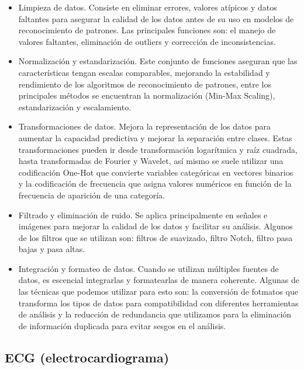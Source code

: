 \begin{itemize}
    \item Limpieza de datos. Consiste en eliminar errores, valores atípicos y datos 
    faltantes para asegurar la calidad de los datos antes de su uso en modelos de 
    reconocimiento de patrones. Las principales funciones son: el manejo de valores 
    faltantes, eliminación de outliers y corrección de inconsistencias.
    
    \item Normalización y estandarización. Este conjunto de funciones aseguran 
    que las características tengan escalas comparables, mejorando la estabilidad y 
    rendimiento de los algoritmos de reconocimiento de patrones, entre los principales 
    métodos se encuentran la normalización (Min-Max Scaling), estandarización y escalamiento.
    
    \item Transformaciones de datos. Mejora la representación de los datos para aumentar 
    la capacidad predictiva y mejorar la separación entre clases. Estas transformaciones 
    pueden ir desde transformación logarítmica y raíz cuadrada, hasta transformadas de 
    Fourier y Wavelet, así mismo se suele utilizar una codificación 
    One-Hot que convierte variables categóricas en vectores binarios y la codificación de 
    frecuencia que asigna valores numéricos en función de la frecuencia de aparición de una 
    categoría.
    
    \item Filtrado y eliminación de ruido. Se aplica principalmente en señales e imágenes 
    para mejorar la calidad de los datos y facilitar su análisis. Algunos de los filtros 
    que se utilizan son: filtros de suavizado, filtro Notch, filtro pasa bajas y pasa altas. 
    
    \item Integración y formateo de datos. Cuando se utilizan múltiples fuentes de datos, 
    es escencial integrarlas y formatearlas de manera coherente. Algunas de las técnicas 
    que podemos utilizar  para esto son: la conversión de fotmatos que transforma los tipos 
    de datos para compatibilidad con diferentes herramientas de análisis y la reducción de 
    redundancia que utilizamos para la eliminación de información duplicada para evitar 
    sesgos en el análisis. 

\end{itemize}

\subsection{ECG (electrocardiograma)}

